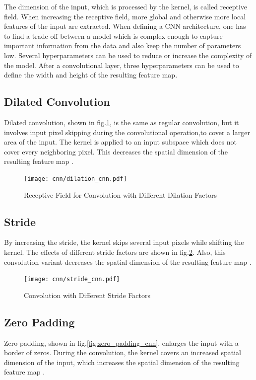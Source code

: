 The dimension of the input, which is processed by the kernel, is called receptive field. When increasing the receptive field, more global and otherwise more local features of the input are extracted. When defining a CNN architecture, one has to find a trade-off between a model which is complex enough to capture important information from the data and also keep the number of parameters low. Several hyperparameters can be used to reduce or increase the complexity of the model. After a convolutional layer, three hyperparameters can be used to define the width and height of the resulting feature map. 

\subsection{Dilated Convolution}
Dilated convolution, shown in fig.\ref{fig:dilated_cnn}, is the same as regular convolution, but it involves input pixel skipping during the convolutional operation,to cover a larger area of the input. The kernel is applied to an input subspace which does not cover every neighboring pixel. This decreases the spatial dimension of the resulting feature map \cite{Ganesh2019}.

\begin{figure}[H]
  \centering
  \texttt{[image: cnn/dilation\_cnn.pdf]}
  \caption {Receptive Field for Convolution with Different Dilation Factors}
  \label{fig:dilated_cnn}
\end{figure}


\subsection{Stride}
By increasing the stride, the kernel skips several input pixels while shifting the kernel. The effects of different stride factors are shown in fig.\ref{fig:stride_cnn}. Also, this convolution variant decreases the spatial dimension of the resulting feature map \cite{OShea2015}.

\begin{figure}[H]
  \centering
  \texttt{[image: cnn/stride\_cnn.pdf]}
  \caption {Convolution with Different Stride Factors}
  \label{fig:stride_cnn}
\end{figure}


\subsection{Zero Padding}
Zero padding, shown in fig.\ref{fig:zero_padding_cnn}, enlarges the input with a border of zeros. During the convolution, the kernel covers an increased spatial dimension of the input, which increases the spatial dimension of the resulting feature map \cite{OShea2015}.

